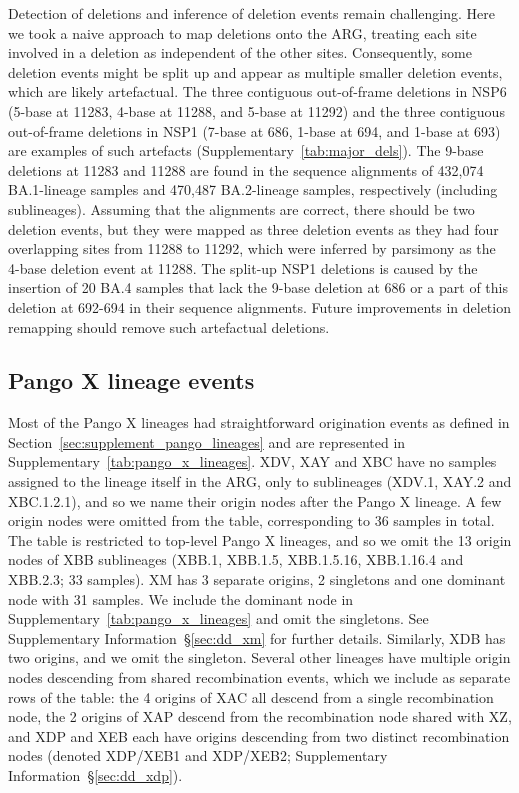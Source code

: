 \documentclass[12pt]{article}
\newcommand{\supref}[1]{Supplementary Information~\S\ref{#1}}
\newcommand{\siref}[1]{Supplementary~\ref{#1}}
\begin{document}
Detection of deletions and inference of deletion events
remain challenging.
Here we took a naive approach to map deletions onto the ARG,
treating each site involved in a deletion
as independent of the other sites.
Consequently, some deletion events might be split up and
appear as multiple smaller deletion events,
which are likely artefactual.
The three contiguous out-of-frame deletions in NSP6
(5-base at 11283, 4-base at 11288, and 5-base at 11292) and
the three contiguous out-of-frame deletions in NSP1
(7-base at 686, 1-base at 694, and 1-base at 693)
are examples of such artefacts (\siref{tab:major_dels}).
The 9-base deletions at 11283 and 11288
are found in the sequence alignments of
432,074 BA.1-lineage samples and 470,487 BA.2-lineage samples,
respectively (including sublineages).
Assuming that the alignments are correct,
there should be two deletion events,
but they were mapped as three deletion events
as they had four overlapping sites from 11288 to 11292,
which were inferred by parsimony
as the 4-base deletion event at 11288.
The split-up NSP1 deletions is caused by
the insertion of 20 BA.4 samples
that lack the 9-base deletion at 686 or
a part of this deletion at 692-694
in their sequence alignments.
Future improvements in deletion remapping
should remove such artefactual deletions.


\subsection{Pango X lineage events}
\label{sec:supplement_x_pango_lineages}

Most of the Pango X lineages had straightforward origination events
as defined in Section~\ref{sec:supplement_pango_lineages}
and are represented in \siref{tab:pango_x_lineages}.
XDV, XAY and XBC have no samples assigned to the lineage itself in the ARG,
only to sublineages (XDV.1, XAY.2 and XBC.1.2.1),
and so we name their origin nodes after the Pango X lineage.
A few origin nodes were omitted from the table,
corresponding to 36 samples in total.
The table is restricted to top-level Pango X lineages,
and so we omit the 13 origin nodes of XBB sublineages
(XBB.1, XBB.1.5, XBB.1.5.16, XBB.1.16.4 and XBB.2.3; 33 samples).
XM has 3 separate origins, 2 singletons and one dominant node
with 31 samples. We include the dominant node in
\siref{tab:pango_x_lineages} and omit the singletons. See
\supref{sec:dd_xm} for further details.
Similarly, XDB has two origins, and we omit the singleton.
Several other lineages have multiple origin nodes descending from shared
recombination events, which we include as separate rows of the table:
the 4 origins of XAC all descend from a single recombination node,
the 2 origins of XAP descend from the recombination node shared with XZ,
and XDP and XEB each have origins descending from two distinct
recombination nodes (denoted XDP/XEB1 and XDP/XEB2;
\supref{sec:dd_xdp}).
\end{document}
